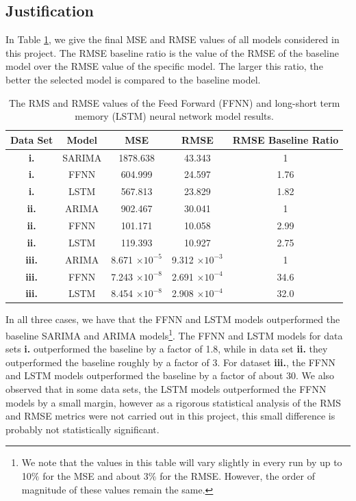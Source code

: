 \documentclass[10pt,a4paper]{article}
\begin{document}
\subsection{Justification}
%
In Table \ref{table: RMS values of neural network models}, we give the final MSE and RMSE values of all models considered in this project. The RMSE baseline ratio is the value of the RMSE of the baseline model over the RMSE value of the specific model. The larger this ratio, the better the selected model is compared to the baseline model.
\begin{table}[h]
\centering
\begin{tabular}{cccc|c}
Data Set & Model & MSE & RMSE  & RMSE Baseline Ratio\\ \hline
{\bf i.} & SARIMA & 1878.638 & 43.343 & 1 \\
{\bf i.} & FFNN & 604.999 & 24.597 &  1.76 \\
{\bf i.} & LSTM & 567.813 & 23.829 &  1.82 \\ \hline 
{\bf ii.} & ARIMA & 902.467 & 30.041 & 1 \\
{\bf ii.} & FFNN & 101.171 & 10.058 &  2.99\\
{\bf ii.} & LSTM & 119.393 & 10.927 &  2.75 \\ \hline
{\bf iii.} & ARIMA & 8.671 $\times 10^{-5}$  &  9.312 $\times 10^{-3}$ & 1 \\
{\bf iii.} & FFNN & 7.243 $\times 10^{-8}$ & 2.691 $\times 10^{-4}$ &  34.6 \\
{\bf iii.} & LSTM & 8.454 $\times 10^{-8}$ & 2.908 $\times 10^{-4}$ &  32.0 \\ \hline
\end{tabular}
\caption{The RMS and RMSE values of the Feed Forward (FFNN) and long-short term memory (LSTM) neural network model results.}
\label{table: RMS values of neural network models}
\end{table}
In all three cases, we have that the FFNN and LSTM models outperformed the baseline SARIMA and ARIMA models\footnote{ We note that the values in this table will vary slightly in every run by up to 10$\%$ for the MSE and about 3$\%$ for the RMSE. However, the order of magnitude of these values remain the same.}. The FFNN and LSTM models for data sets {\bf i.} outperformed the baseline by a factor of 1.8, while in data set {\bf ii.} they outperformed the baseline roughly by a factor of 3. For dataset {\bf iii.}, the FFNN and LSTM models  outperformed the baseline by a factor of about 30. We also observed that in some data sets, the LSTM models outperformed the FFNN models by a small margin, however as a rigorous statistical analysis of the RMS and RMSE metrics were not carried out in this project, this small difference is probably not statistically significant. 
\end{document}
